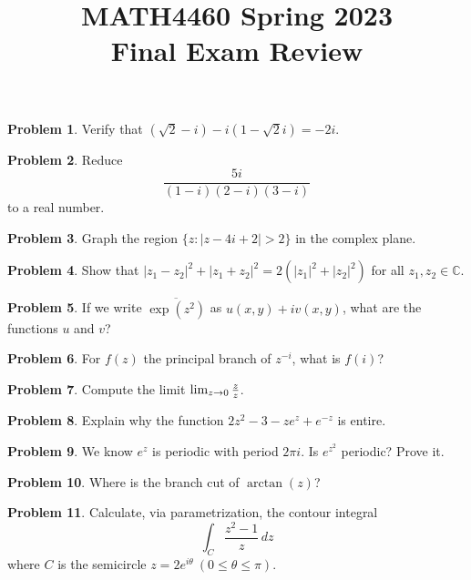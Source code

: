 \documentclass[11pt,oneside]{amsart}
\title{MATH4460 Spring 2023\\
Final Exam Review}
\theoremstyle{definition}
\newtheorem{problem}{Problem}
\newcommand{\bC}{\mathbb{C}}
\let\Im\relax
\DeclareMathOperator{\Im}{Im}
\begin{document}
\maketitle

\begin{problem} %
  Verify that $(\sqrt2-i)-i(1-\sqrt2 i)=-2i$.
\end{problem}

\begin{problem} %
  Reduce
  \[\frac{5i}{(1-i)(2-i)(3-i)}\]
  to a real number.
\end{problem}

\begin{problem} %
  Graph the region $\{z\colon |z-4i+2| >2\}$ in the complex plane.
\end{problem}

\begin{problem} %
  Show that $|z_1-z_2|^2+|z_1+z_2|^2=2(|z_1|^2+|z_2|^2)$ for all $z_1,z_2\in\bC$.
\end{problem}

\begin{problem} %
  If we write $\overline{\exp(z^2)}$ as $u(x,y)+iv(x,y)$, what are the functions $u$ and $v$?
\end{problem}

\begin{problem} %
  For $f(z)$ the principal branch of $z^{-i}$, what is $f(i)$?
\end{problem}

\begin{problem} %
  Compute the limit $\lim_{z\to 0}\frac{\Im z}z$.
\end{problem}

\begin{problem} %
  Explain why the function $2z^2-3-ze^z+e^{-z}$ is entire.
\end{problem}

\begin{problem}
  We know $e^z$ is periodic with period $2\pi i$. Is $e^{z^2}$ periodic? Prove it.
\end{problem}

\begin{problem} %
  Where is the branch cut of $\arctan(z)$?
\end{problem}

\begin{problem}
  Calculate, via parametrization, the contour integral
  \[\int_C\frac{z^2-1}z\,dz\]
  where $C$ is the semicircle $z=2e^{i\theta}\ (0\leq \theta\leq\pi)$.
\end{problem}
\end{document}

